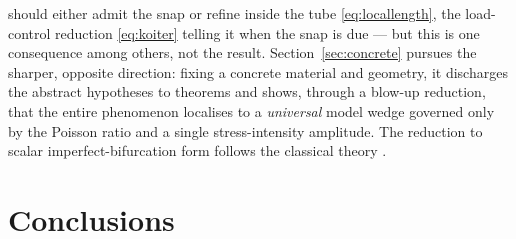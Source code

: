 should either admit the snap or refine inside the tube \eqref{eq:locallength}, the load-control reduction
\eqref{eq:koiter} telling it when the snap is due --- but this is one consequence among others, not the result.
Section~\ref{sec:concrete} pursues the sharper, opposite direction: fixing a concrete material and geometry, it
discharges the abstract hypotheses to theorems and shows, through a blow-up reduction, that the entire phenomenon
localises to a \emph{universal} model wedge governed only by the Poisson ratio and a single stress-intensity amplitude.
The reduction to scalar imperfect-bifurcation form follows the classical theory
\cite{GolubitskySchaeffer1985,KeenerKeller1973,Koiter1945}.





\section{Conclusions}
\label{sec:conclusions}


